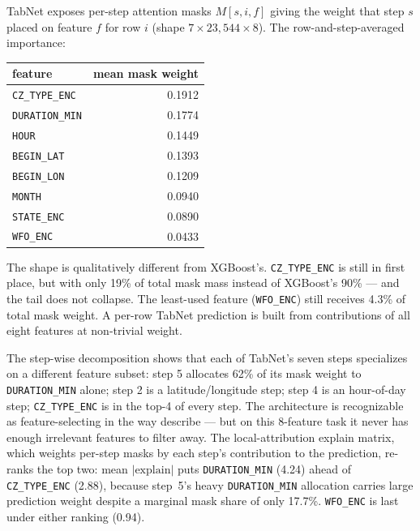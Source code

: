 \documentclass[11pt]{article}
\begin{document}
TabNet exposes per-step attention masks $M[s, i, f]$ giving the
weight that step $s$ placed on feature $f$ for row $i$ (shape
$7 \times 23{,}544 \times 8$). The row-and-step-averaged importance:

\begin{center}
\small
\begin{tabular}{lr}
\toprule
feature & mean mask weight \\
\midrule
\texttt{CZ\_TYPE\_ENC}  & 0.1912 \\
\texttt{DURATION\_MIN}  & 0.1774 \\
\texttt{HOUR}           & 0.1449 \\
\texttt{BEGIN\_LAT}     & 0.1393 \\
\texttt{BEGIN\_LON}     & 0.1209 \\
\texttt{MONTH}          & 0.0940 \\
\texttt{STATE\_ENC}     & 0.0890 \\
\texttt{WFO\_ENC}       & 0.0433 \\
\bottomrule
\end{tabular}
\end{center}

The shape is qualitatively different from XGBoost's.
\texttt{CZ\_TYPE\_ENC} is still in first place, but with only 19\%
of total mask mass instead of XGBoost's 90\% --- and the tail does
not collapse. The least-used feature (\texttt{WFO\_ENC}) still
receives 4.3\% of total mask weight. A per-row TabNet prediction is
built from contributions of all eight features at non-trivial
weight.

The step-wise decomposition shows that each of TabNet's seven steps
specializes on a different feature subset: step 5 allocates 62\% of its mask weight to
\texttt{DURATION\_MIN} alone; step 2 is a latitude/longitude step;
step 4 is an hour-of-day step; \texttt{CZ\_TYPE\_ENC} is in the
top-4 of every step. The architecture is recognizable as
feature-selecting in the way \citet{arik2021tabnet} describe --- but
on this 8-feature task it never has enough irrelevant features to
filter away. The local-attribution explain matrix, which weights
per-step masks by each step's contribution to the prediction,
re-ranks the top two: mean $|\mathrm{explain}|$ puts
\texttt{DURATION\_MIN} (4.24) ahead of \texttt{CZ\_TYPE\_ENC} (2.88),
because step~5's heavy \texttt{DURATION\_MIN} allocation carries
large prediction weight despite a marginal mask share of only
17.7\%. \texttt{WFO\_ENC} is last under either ranking (0.94).
\end{document}
